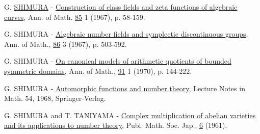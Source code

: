 \documentclass[10pt]{article}
\begin{document}
\begin{description}[leftmargin=3.0em,labelwidth=2.4em,labelsep=.6em,font=\normalfont,style=multiline]
\item[{[12]}] G. \uline{SHIMURA} - \uline{Construction of class fields and zeta functions of algebraic curves}, Ann. of Math. \uline{85} 1 (1967), p. 58-159.
\item[{[13]}] G. SHIMURA - \uline{Algebraic number fields and symplectic discontinuous groups}, Ann. of Math., \uline{86} 3 (1967), p. 503-592.
\item[{[14]}] G. SHIMURA - \uline{On canonical models of arithmetic quotients of bounded symmetric domains}, Ann. of Math., \uline{91} 1 (1970), p. 144-222.
\item[{[15]}] G. SHIMURA - \uline{Automorphic functions and number theory}, Lecture Notes in Math. 54, 1968, Springer-Verlag.
\item[{[16]}] G. SHIMURA and T. TANIYAMA - \uline{Complex multiplication of abelian varieties and its applications to number theory}, Publ. Math. Soc. Jap., \uline{6} (1961).
\end{description}

\end{document}
